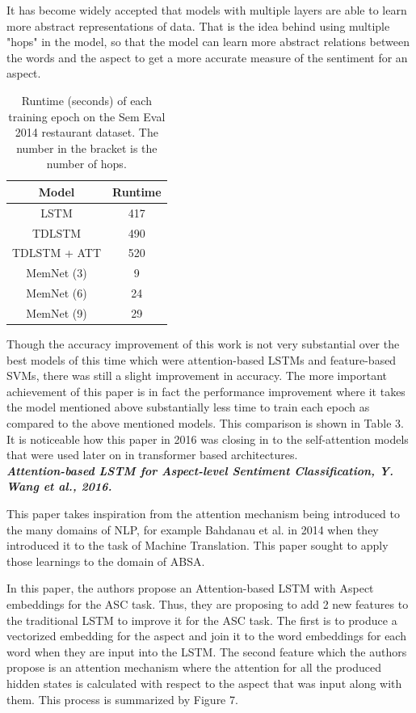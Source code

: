 \documentclass[conference]{IEEEtran}
\begin{document}
It has become widely accepted that models with multiple layers are able to learn more abstract representations of data. That is the idea behind using multiple "hops" in the model, so that the model can learn more abstract relations between the words and the aspect to get a more accurate measure of the sentiment for an aspect.

\begin{table}[htbp]
\caption{Runtime (seconds) of each training epoch on the Sem Eval 2014 restaurant dataset. The number in the bracket is the number of hops.}
\begin{center}
\begin{tabular}{|c|c|}
\hline
\textbf{Model} & \textbf{Runtime} \\
\hline
LSTM & 417 \\
TDLSTM & 490 \\
TDLSTM + ATT & 520 \\
\hline
MemNet (3) & 9 \\
MemNet (6) & 24 \\
MemNet (9) & 29 \\
\hline
\end{tabular}
\end{center}
\end{table}

Though the accuracy improvement of this work is not very substantial over the best models of this time which were attention-based LSTMs and feature-based SVMs, there was still a slight improvement in accuracy. The more important achievement of this paper is in fact the performance improvement where it takes the model mentioned above substantially less time to train each epoch as compared to the above mentioned models. This comparison is shown in Table 3. It is noticeable how this paper in 2016 was closing in to the self-attention models that were used later on in transformer based architectures.\\

\textit{\textbf{Attention-based LSTM for Aspect-level Sentiment Classification, Y. Wang et al., 2016.}}

This paper takes inspiration from the attention mechanism being introduced to the many domains of NLP, for example Bahdanau et al. in 2014 when they introduced it to the task of Machine Translation. This paper sought to apply those learnings to the domain of ABSA.

In this paper, the authors propose an Attention-based LSTM with Aspect embeddings for the ASC task. Thus, they are proposing to add 2 new features to the traditional LSTM to improve it for the ASC task. The first is to produce a vectorized embedding for the aspect and join it to the word embeddings for each word when they are input into the LSTM. The second feature which the authors propose is an attention mechanism where the attention for all the produced hidden states is calculated with respect to the aspect that was input along with them. This process is summarized by Figure 7.
\end{document}
